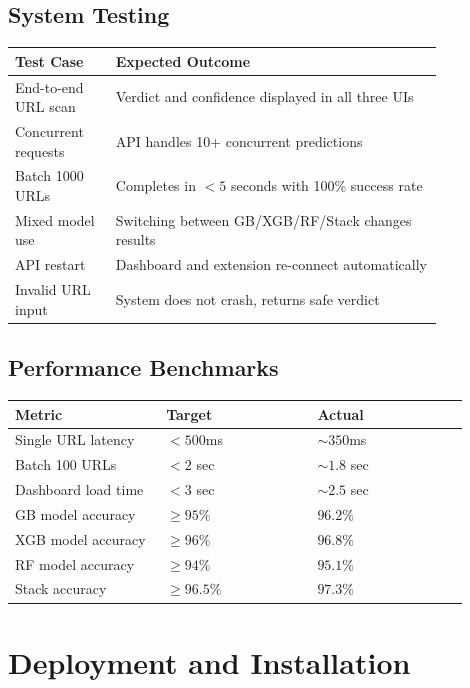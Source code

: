 \documentclass[12pt,a4paper]{report}
\begin{document}
\section{System Testing}

\begin{longtable}{p{0.20\linewidth}p{0.65\linewidth}}
\toprule
\textbf{Test Case} & \textbf{Expected Outcome} \\
\midrule
End-to-end URL scan & Verdict and confidence displayed in all three UIs \\
Concurrent requests & API handles 10+ concurrent predictions \\
Batch 1000 URLs & Completes in $<5$ seconds with 100\% success rate \\
Mixed model use & Switching between GB/XGB/RF/Stack changes results \\
API restart & Dashboard and extension re-connect automatically \\
Invalid URL input & System does not crash, returns safe verdict \\
\bottomrule
\end{longtable}

\section{Performance Benchmarks}

\begin{longtable}{p{0.30\linewidth}p{0.30\linewidth}p{0.30\linewidth}}
\toprule
\textbf{Metric} & \textbf{Target} & \textbf{Actual} \\
\midrule
Single URL latency & $<500$ms & $\sim 350$ms \\
Batch 100 URLs & $<2$ sec & $\sim 1.8$ sec \\
Dashboard load time & $<3$ sec & $\sim 2.5$ sec \\
GB model accuracy & $\geq 95\%$ & $96.2\%$ \\
XGB model accuracy & $\geq 96\%$ & $96.8\%$ \\
RF model accuracy & $\geq 94\%$ & $95.1\%$ \\
Stack accuracy & $\geq 96.5\%$ & $97.3\%$ \\
\bottomrule
\end{longtable}

\chapter{Deployment and Installation}
\end{document}
